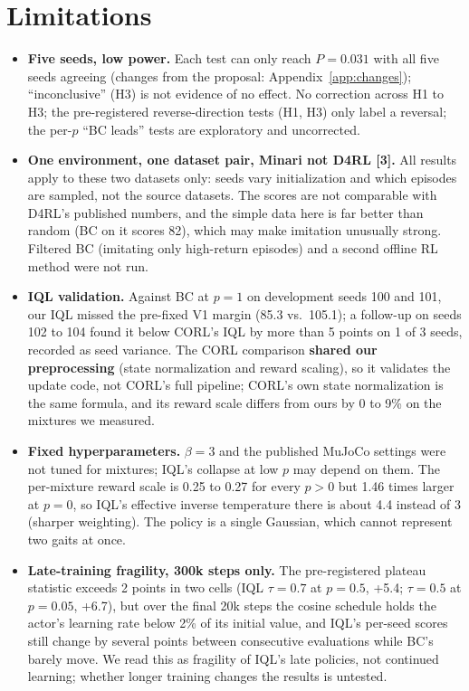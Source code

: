 \documentclass{article}
\begin{document}
\section{Limitations}
\begin{itemize}
  \item \textbf{Five seeds, low power.} Each test can only reach $P=0.031$ with all five seeds agreeing (changes from the proposal: Appendix~\ref{app:changes}); ``inconclusive'' (H3) is not evidence of no effect. No correction across H1 to H3; the pre-registered reverse-direction tests (H1, H3) only label a reversal; the per-$p$ ``BC leads'' tests are exploratory and uncorrected.
  \item \textbf{One environment, one dataset pair, Minari not D4RL [3].} All results apply to these two datasets only: seeds vary initialization and which episodes are sampled, not the source datasets. The scores are not comparable with D4RL's published numbers, and the simple data here is far better than random (BC on it scores 82), which may make imitation unusually strong. Filtered BC (imitating only high-return episodes) and a second offline RL method were not run.
  \item \textbf{IQL validation.} Against BC at $p=1$ on development seeds 100 and 101, our IQL missed the pre-fixed V1 margin (85.3 vs.\ 105.1); a follow-up on seeds 102 to 104 found it below CORL's IQL by more than 5 points on 1 of 3 seeds, recorded as seed variance. The CORL comparison \textbf{shared our preprocessing} (state normalization and reward scaling), so it validates the update code, not CORL's full pipeline; CORL's own state normalization is the same formula, and its reward scale differs from ours by 0 to 9\% on the mixtures we measured.
  \item \textbf{Fixed hyperparameters.} $\beta=3$ and the published MuJoCo settings were not tuned for mixtures; IQL's collapse at low $p$ may depend on them. The per-mixture reward scale is 0.25 to 0.27 for every $p>0$ but 1.46 times larger at $p=0$, so IQL's effective inverse temperature there is about 4.4 instead of 3 (sharper weighting). The policy is a single Gaussian, which cannot represent two gaits at once.
  \item \textbf{Late-training fragility, 300k steps only.} The pre-registered plateau statistic exceeds 2 points in two cells (IQL $\tau=0.7$ at $p=0.5$, +5.4; $\tau=0.5$ at $p=0.05$, +6.7), but over the final 20k steps the cosine schedule holds the actor's learning rate below 2\% of its initial value, and IQL's per-seed scores still change by several points between consecutive evaluations while BC's barely move. We read this as fragility of IQL's late policies, not continued learning; whether longer training changes the results is untested.
\end{itemize}
\end{document}
